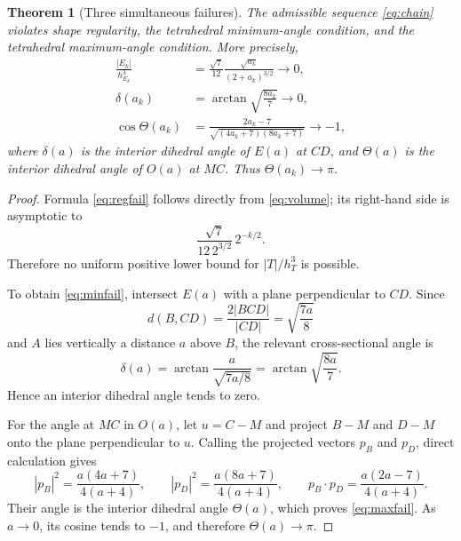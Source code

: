 \documentclass[10pt,a4paper]{amsart}
\newtheorem{theorem}{Theorem}
\begin{document}
\begin{theorem}[Three simultaneous failures]\label{thm:failure}
The admissible sequence \eqref{eq:chain} violates shape regularity, the tetrahedral minimum-angle condition, and the tetrahedral maximum-angle condition.  More precisely,
\begin{align}
\frac{|E_k|}{h_{E_k}^3}
&=\frac{\sqrt7}{12}\frac{\sqrt{a_k}}{(2+a_k)^{3/2}}
\longrightarrow0, \label{eq:regfail}\\
\delta(a_k)
&=\arctan\sqrt{\frac{8a_k}{7}}
\longrightarrow0, \label{eq:minfail}\\
\cos\Theta(a_k)
&=\frac{2a_k-7}{\sqrt{(4a_k+7)(8a_k+7)}}
\longrightarrow-1, \label{eq:maxfail}
\end{align}
where $\delta(a)$ is the interior dihedral angle of $E(a)$ at $CD$, and $\Theta(a)$ is the interior dihedral angle of $O(a)$ at $MC$.  Thus $\Theta(a_k)\to\pi$.
\end{theorem}

\begin{proof}
Formula \eqref{eq:regfail} follows directly from \eqref{eq:volume}; its right-hand side is asymptotic to
\[
\frac{\sqrt7}{12\,2^{3/2}}\,2^{-k/2}.
\]
Therefore no uniform positive lower bound for $|T|/h_T^3$ is possible.

To obtain \eqref{eq:minfail}, intersect $E(a)$ with a plane perpendicular to $CD$.  Since
\[
d(B,CD)=\frac{2|BCD|}{|CD|}=\sqrt{\frac{7a}{8}}
\]
and $A$ lies vertically a distance $a$ above $B$, the relevant cross-sectional angle is
\[
\delta(a)=\arctan\frac{a}{\sqrt{7a/8}}
=\arctan\sqrt{\frac{8a}{7}}.
\]
Hence an interior dihedral angle tends to zero.

For the angle at $MC$ in $O(a)$, let $u=C-M$ and project $B-M$ and $D-M$ onto the plane perpendicular to $u$.  Calling the projected vectors $p_B$ and $p_D$, direct calculation gives
\[
|p_B|^2=\frac{a(4a+7)}{4(a+4)},\qquad
|p_D|^2=\frac{a(8a+7)}{4(a+4)},\qquad
p_B\!\cdot p_D=\frac{a(2a-7)}{4(a+4)}.
\]
Their angle is the interior dihedral angle $\Theta(a)$, which proves \eqref{eq:maxfail}.  As $a\to0$, its cosine tends to $-1$, and therefore $\Theta(a)\to\pi$.
\end{proof}
\end{document}
